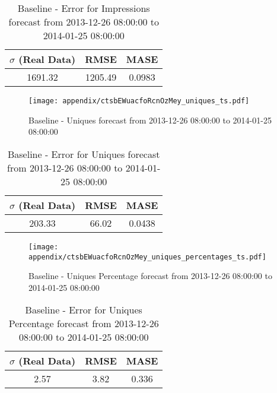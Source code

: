 \begin{table}[H]
\centering
\footnotesize
\begin{tabular}{ccc}
$\sigma$ (Real Data) & RMSE & MASE   \\ \hline
1691.32 & 1205.49 & 0.0983 \\
\end{tabular}

\vspace{0.5cm}

\caption{
Baseline - Error for Impressions forecast from 2013-12-26 08:00:00 to 2014-01-25 08:00:00}
\end{table}

\begin{figure}[H] \begin{center} \leavevmode
\texttt{[image: appendix/ctsbEWuacfoRcnOzMey\_uniques\_ts.pdf]} \caption{
Baseline - Uniques forecast from 2013-12-26 08:00:00 to 2014-01-25 08:00:00} \label{fig:appendix/ctsbEWuacfoRcnOzMey_uniques_ts.pdf} \end{center}
\end{figure}

\begin{table}[H]
\centering
\footnotesize
\begin{tabular}{ccc}
$\sigma$ (Real Data) & RMSE & MASE   \\ \hline
203.33 & 66.02 & 0.0438 \\
\end{tabular}

\vspace{0.5cm}

\caption{
Baseline - Error for Uniques forecast from 2013-12-26 08:00:00 to 2014-01-25 08:00:00}
\end{table}

\begin{figure}[H] \begin{center} \leavevmode
\texttt{[image: appendix/ctsbEWuacfoRcnOzMey\_uniques\_percentages\_ts.pdf]} \caption{
Baseline - Uniques Percentage forecast from 2013-12-26 08:00:00 to 2014-01-25 08:00:00} \label{fig:appendix/ctsbEWuacfoRcnOzMey_uniques_percentages_ts.pdf} \end{center}
\end{figure}

\begin{table}[H]
\centering
\footnotesize
\begin{tabular}{ccc}
$\sigma$ (Real Data) & RMSE & MASE   \\ \hline
2.57 & 3.82 & 0.336 \\
\end{tabular}

\vspace{0.5cm}

\caption{
Baseline - Error for Uniques Percentage forecast from 2013-12-26 08:00:00 to 2014-01-25 08:00:00}
\end{table}

